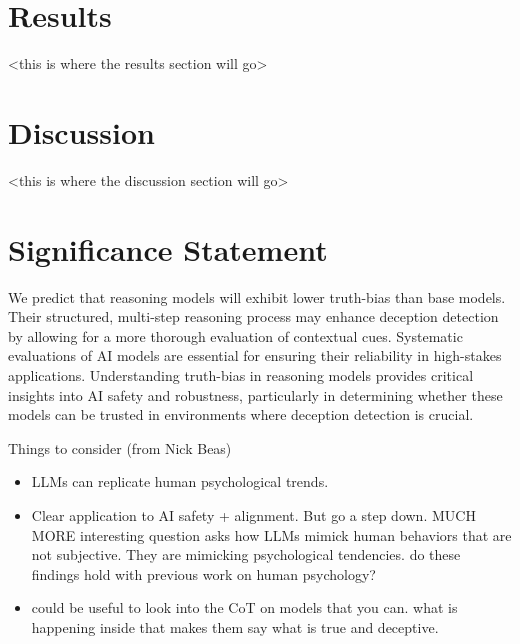 \documentclass{article}
\begin{document}
\section{Results}

<this is where the results section will go>

\section{Discussion}

<this is where the discussion section will go>

\section{Significance Statement}

We predict that reasoning models will exhibit lower truth-bias than base models. Their structured, multi-step reasoning process may enhance deception detection by allowing for a more thorough evaluation of contextual cues. Systematic evaluations of AI models are essential for ensuring their reliability in high-stakes applications. Understanding truth-bias in reasoning models provides critical insights into AI safety and robustness, particularly in determining whether these models can be trusted in environments where deception detection is crucial.

Things to consider (from Nick Beas)
\begin{itemize}
    \item LLMs can replicate human psychological trends.
    \item Clear application to AI safety + alignment. But go a step down. MUCH MORE interesting question asks how LLMs mimick human behaviors that are not subjective. They are mimicking psychological tendencies. do these findings hold with previous work on human psychology?
    \item could be useful to look into the CoT on models that you can. what is happening inside that makes them say what is true and deceptive.
\end{itemize}



\end{document}
